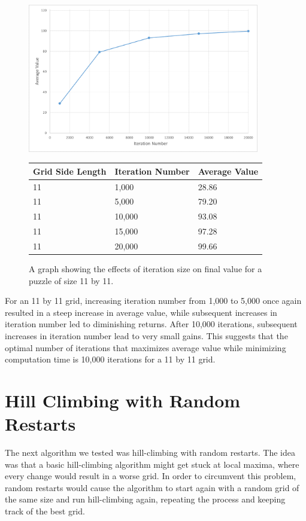 \documentclass[12pt]{article}
\begin{document}
\begin{figure}[H]
    \centering
    \includegraphics[width=0.9\textwidth]{hill_climbing_11x11_iterations_excel}
\begin{tabular}{ |p{4cm}||p{4cm}|p{4cm}|  }
 \hline
Grid Side Length& Iteration Number &Average Value\\
 \hline
11&1,000&28.86\\
11&5,000&79.20\\
11&10,000&93.08\\
11&15,000&97.28\\
11&20,000&99.66\\
 \hline
\end{tabular}
    \caption{A graph showing the effects of iteration size on final value for a puzzle of size 11 by 11.}
    \label{fig:hill_climbing_11x11_iterations}
\end{figure}



For an 11 by 11 grid, increasing iteration number from 1,000 to 5,000 once again resulted in a steep increase in average value, while subsequent increases in iteration number led to diminishing returns. After 10,000 iterations, subsequent increases in iteration number lead to very small gains. This suggests that the optimal number of iterations that maximizes average value while minimizing computation time is 10,000 iterations for a 11 by 11 grid.


\section*{Hill Climbing with Random Restarts}

The next algorithm we tested was hill-climbing with random restarts. The idea was that a basic hill-climbing algorithm might get stuck at local maxima, where every change would result in a worse grid. In order to circumvent this problem, random restarts would cause the algorithm to start again with a random grid of the same size and run hill-climbing again, repeating the process and keeping track of the best grid.
\end{document}
